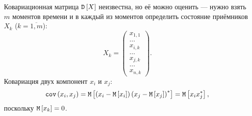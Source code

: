 Ковариационная матрица $\mathtt{D} \left [ X \right ]$ неизвестна, но её можно оценить --- нужно взять $m$ моментов времени и в каждый из моментов определить состояние приёмников $X_k$
($k = \overline{1,m}$):
\[
    X_k =
    \begin{pmatrix}
        x_{1,1} \\
        \dots   \\
        x_{i,k} \\
        \dots   \\
        x_{j,k} \\
        \dots   \\
        x_{n,k}
    \end{pmatrix} .
\]
Ковариация двух компонент $x_i$ и $x_j$:
\[
    \mathtt{cov} \left ( x_i, x_j \right )
    = \mathtt{M} \left [ \left( x_i - \mathtt{M} \left [ x_i \right ] \right) \left( x_j - \mathtt{M} \left [ x_j \right ] \right)^* \right ]
    = \mathtt{M} \left [  x_i x_j^* \right ],
\]
поскольку $\mathtt{M} \left [ x_k \right ] = 0$.

